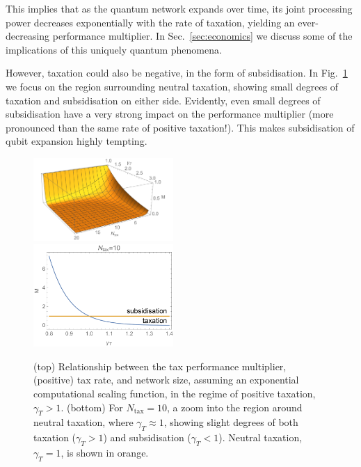 This implies that as the quantum network expands over time, its joint processing power decreases exponentially with the rate of taxation, yielding an ever-decreasing performance multiplier. In Sec.~\ref{sec:economics} we discuss some of the implications of this uniquely quantum phenomena.

However, taxation could also be negative, in the form of subsidisation. In Fig.~\ref{fig:tax_exp} we focus on the region surrounding neutral taxation, showing small degrees of taxation and subsidisation on either side. Evidently, even small degrees of subsidisation have a very strong impact on the performance multiplier (more pronounced than the same rate of positive taxation!). This makes subsidisation of qubit expansion highly tempting.

\pubmode
\begin{figure}[!htbp]
\includegraphics[clip=true, width=0.475\textwidth]{tax_exp}\\
\includegraphics[clip=true, width=0.475\textwidth]{tax_subsidy}
\captionspacefig \caption{(top) Relationship between the tax performance multiplier, (positive) tax rate, and network size, assuming an exponential computational scaling function, in the regime of positive taxation, \mbox{$\gamma_T>1$}. (bottom) For \mbox{$N_\mathrm{tax}=10$}, a zoom into the region around neutral taxation, where \mbox{$\gamma_T\approx 1$}, showing slight degrees of both taxation (\mbox{$\gamma_T>1$}) and subsidisation (\mbox{$\gamma_T<1$}). Neutral taxation, \mbox{$\gamma_T=1$}, is shown in orange.}\label{fig:tax_exp}
\end{figure}
\else
